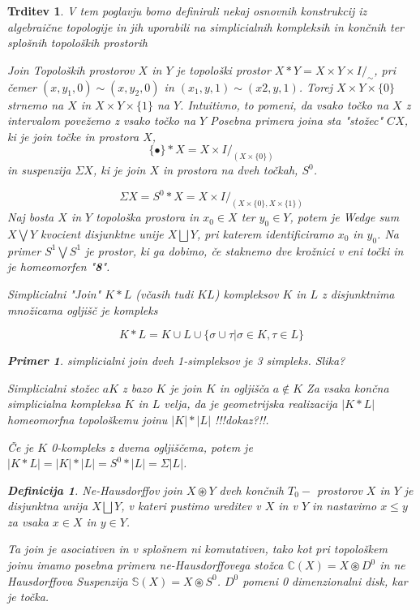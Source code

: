 \documentclass[a4paper,12pt]{article}
\theoremstyle{definition}
\newtheorem{definicija}{Definicija}
\theoremstyle{plain}
\theoremstyle{definition}
\newtheorem{primer}{Primer}
\theoremstyle{plain}
\newtheorem{trditev}{Trditev}
\theoremstyle{plain}
\theoremstyle{plain}
\theoremstyle{plain}
\begin{document}
\begin{trditev}
V tem poglavju bomo definirali nekaj osnovnih konstrukcij iz algebraične topologije in jih uporabili na simplicialnih kompleksih in končnih ter splošnih topoloških prostorih

\textit{Join} Topoloških prostorov $X$ in $Y$ je topološki prostor $X\ast Y = X\times Y 
\times I /_{\sim}$, pri čemer $(x, y_1, 0) \sim (x, y_2, 0)$ in  $(x_1, y, 1) \sim (x2, y, 1)$. 
Torej $X\times Y\times \{0\}$ strnemo na $X$ in $X\times Y\times \{1\}$ na $Y$. Intuitivno, 
to pomeni, da vsako točko na $X$ z intervalom povežemo z vsako točko na $Y$
Posebna primera joina sta "stožec" $CX$, ki je join točke in prostora $X$, 
$$\{\bullet\}\ast X=X\times I /_{(X\times \{0\})}$$
in \textit{suspenzija} $\Sigma X$, ki je join $X$ in prostora na dveh točkah, $S^0$.

$$
\Sigma X=S^0\ast X = X\times I /_{(X\times \{0\},X\times \{1\})}
$$
Naj bosta $X$ in $Y$ topološka prostora in $x_0\in X$ ter $y_0\in Y$, potem je 
\textit{Wedge sum} $X\bigvee Y$ kvocient disjunktne unije $X\bigsqcup Y$, pri
 katerem identificiramo $x_0$ in $y_0$. Na primer $S^1\bigvee S^1$ je prostor,
  ki ga dobimo, če staknemo dve krožnici v eni točki in je homeomorfen "\textbf{8}".




\textit{Simplicialni "Join" $K\ast L$} (včasih tudi $KL$) kompleksov $K$ in $L$ z disjunktnima množicama ogljišč je kompleks

$$
K\ast L=K\cup L \cup \{\sigma \cup \tau| \sigma \in K, \tau \in L \}
$$

\begin{primer}
    simplicialni join dveh 1-simpleksov je 3 simpleks. Slika?
\end{primer}

\textit{Simplicialni stožec} $aK$ z bazo $K$ je join $K$ in ogljišča $a\notin K$
Za vsaka končna simplicialna kompleksa $K$ in $L$ velja, da je geometrijska realizacija $|K\ast L|$ homeomorfna topološkemu joinu $|K|\ast |L|$ !!!dokaz?!!.

Če je $K$ 0-kompleks z dvema ogljiščema, potem je $|K\ast L|=|K|\ast |L|=S^0\ast |L| = \Sigma |L|$.

\begin{definicija}
    \textit{Ne-Hausdorffov join} $X\circledast Y$ dveh končnih $T_0-$
    prostorov $X$ in $Y$ je disjunktna unija $X\bigsqcup Y$, v kateri
     pustimo ureditev v $X$ in v $Y$ in nastavimo $x\leq y$ za vsaka 
     $x\in X$ in $y\in Y$.
\end{definicija}
Ta join je asociativen in v splošnem ni komutativen, tako kot pri topološkem
 joinu imamo posebna primera ne-Hausdorffovega stožca $\mathds{C}(X)=X\circledast
  D^0$ in ne Hausdorffova Suspenzija $\mathds{S}(X)=X \circledast S^0$. 
  $D^0$ pomeni 0 dimenzionalni disk, kar je točka.


\end{trditev}
\end{document}
